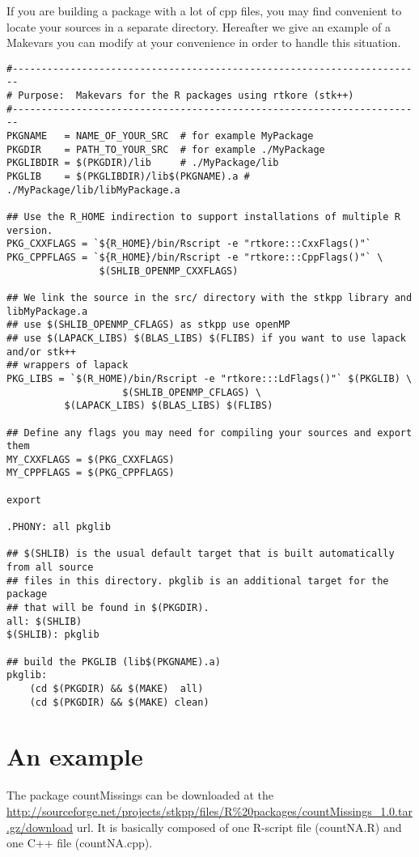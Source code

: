 \documentclass[a4paper,10pt]{article}
\begin{document}
If you are building a package with a lot of cpp files, you may find
convenient to locate your sources in a separate directory. Hereafter we give an
example of a Makevars you can modify at your convenience in order to handle
this situation.
\begin{verbatim}
#-----------------------------------------------------------------------
# Purpose:  Makevars for the R packages using rtkore (stk++)
#-----------------------------------------------------------------------
PKGNAME   = NAME_OF_YOUR_SRC  # for example MyPackage
PKGDIR    = PATH_TO_YOUR_SRC  # for example ./MyPackage
PKGLIBDIR = $(PKGDIR)/lib     # ./MyPackage/lib
PKGLIB    = $(PKGLIBDIR)/lib$(PKGNAME).a # ./MyPackage/lib/libMyPackage.a

## Use the R_HOME indirection to support installations of multiple R version.
PKG_CXXFLAGS = `${R_HOME}/bin/Rscript -e "rtkore:::CxxFlags()"`
PKG_CPPFLAGS = `${R_HOME}/bin/Rscript -e "rtkore:::CppFlags()"` \
                $(SHLIB_OPENMP_CXXFLAGS)

## We link the source in the src/ directory with the stkpp library and libMyPackage.a
## use $(SHLIB_OPENMP_CFLAGS) as stkpp use openMP
## use $(LAPACK_LIBS) $(BLAS_LIBS) $(FLIBS) if you want to use lapack and/or stk++
## wrappers of lapack
PKG_LIBS = `$(R_HOME)/bin/Rscript -e "rtkore:::LdFlags()"` $(PKGLIB) \
					$(SHLIB_OPENMP_CFLAGS) \
          $(LAPACK_LIBS) $(BLAS_LIBS) $(FLIBS)

## Define any flags you may need for compiling your sources and export them
MY_CXXFLAGS = $(PKG_CXXFLAGS)
MY_CPPFLAGS = $(PKG_CPPFLAGS)

export

.PHONY: all pkglib

## $(SHLIB) is the usual default target that is built automatically from all source
## files in this directory. pkglib is an additional target for the package
## that will be found in $(PKGDIR).
all: $(SHLIB)
$(SHLIB): pkglib

## build the PKGLIB (lib$(PKGNAME).a)
pkglib:
	(cd $(PKGDIR) && $(MAKE)  all)
	(cd $(PKGDIR) && $(MAKE) clean)
\end{verbatim}

\section{An example}

The package countMissings can be downloaded at the
\url{http://sourceforge.net/projects/stkpp/files/R%20packages/countMissings_1.0.tar.gz/download}
url. It is basically composed of one R-script file (countNA.R) and one C++ file
(countNA.cpp).
\end{document}

